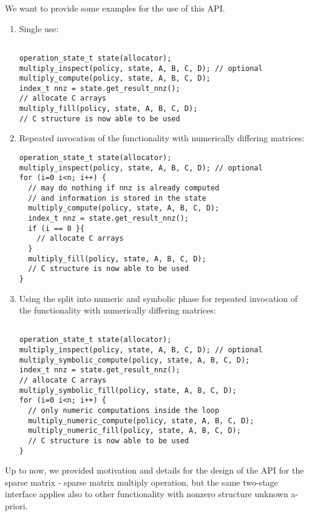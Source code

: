 \documentclass{article}
\begin{document}
We want to provide some examples for the use of this API. 
\begin{enumerate}
    \item Single use:
\begin{verbatim}

operation_state_t state(allocator);
multiply_inspect(policy, state, A, B, C, D); // optional
multiply_compute(policy, state, A, B, C, D);
index_t nnz = state.get_result_nnz();
// allocate C arrays 
multiply_fill(policy, state, A, B, C, D);
// C structure is now able to be used
\end{verbatim}
\item 
Repeated invocation of the functionality with numerically differing matrices:
\begin{verbatim}
operation_state_t state(allocator);
multiply_inspect(policy, state, A, B, C, D); // optional
for (i=0 i<n; i++) {
  // may do nothing if nnz is already computed
  // and information is stored in the state
  multiply_compute(policy, state, A, B, C, D);
  index_t nnz = state.get_result_nnz();
  if (i == 0 }{
    // allocate C arrays 
  }
  multiply_fill(policy, state, A, B, C, D);
  // C structure is now able to be used
}
\end{verbatim}
\item 
Using the split into numeric and symbolic phase for repeated invocation of the functionality with numerically differing matrices:
\begin{verbatim}

operation_state_t state(allocator);
multiply_inspect(policy, state, A, B, C, D); // optional
multiply_symbolic_compute(policy, state, A, B, C, D);
index_t nnz = state.get_result_nnz();
// allocate C arrays 
multiply_symbolic_fill(policy, state, A, B, C, D);
for (i=0 i<n; i++) {
  // only numeric computations inside the loop
  multiply_numeric_compute(policy, state, A, B, C, D);
  multiply_numeric_fill(policy, state, A, B, C, D);
  // C structure is now able to be used
}
\end{verbatim}
\end{enumerate}




Up to now, we provided motivation and details for the design of the API for the sparse matrix - sparse matrix multiply operation, but the same two-stage interface applies also to other functionality with nonzero structure unknown a-priori.
\end{document}

